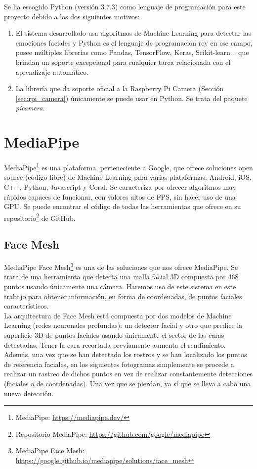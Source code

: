 Se ha escogido Python (versión 3.7.3) como lenguaje de programación para este proyecto debido a los dos siguientes motivos:

\begin{enumerate}
    \item El sistema desarrollado usa algoritmos de Machine Learning para detectar las emociones faciales y Python es el lenguaje de programación rey en ese campo, posee múltiples librerías como Pandas, TensorFlow, Keras, Scikit-learn... que brindan un soporte excepcional para cualquier tarea relacionada con el aprendizaje automático.
    
    \item La librería que da soporte oficial a la Raspberry Pi Camera (Sección \ref{sec:rpi_camera}) únicamente se puede usar en Python. Se trata del paquete \textit{picamera}.
\end{enumerate}

\section{MediaPipe}

MediaPipe\footnote{MediaPipe: \url{https://mediapipe.dev/}} es una plataforma, perteneciente a Google, que ofrece soluciones open source (código libre) de Machine Learning para varias plataformas: Android, iOS, C++, Python, Javascript y Coral. Se caracteriza por ofrecer algoritmos muy rápidos capaces de funcionar, con valores altos de FPS, sin hacer uso de una GPU. Se puede encontrar el código de todas las herramientas que ofrece en su repositorio\footnote{Repositorio MediaPipe: \url{https://github.com/google/mediapipe}} de GitHub.

\subsection{Face Mesh}

MediaPipe Face Mesh\footnote{MediaPipe Face Mesh: \url{https://google.github.io/mediapipe/solutions/face_mesh}} es una de las soluciones que nos ofrece MediaPipe. Se trata de una herramienta que detecta una malla facial 3D compuesta por 468 puntos usando únicamente una cámara. Haremos uso de este sistema en este trabajo para obtener información, en forma de coordenadas, de puntos faciales característicos.\\

La arquitectura de Face Mesh está compuesta por dos modelos de Machine Learning (redes neuronales profundas): un detector facial y otro que predice la superficie 3D de puntos faciales usando únicamente el sector de las caras detectadas. Tener la cara recortada previamente aumenta el rendimiento. Además, una vez que se han detectado los rostros y se han localizado los puntos de referencia faciales, en los siguientes fotogramas simplemente se procede a realizar un rastreo de dichos puntos en vez de realizar constantemente detecciones (faciales o de coordenadas). Una vez que se pierdan, ya sí que se lleva a cabo una nueva detección.\\


